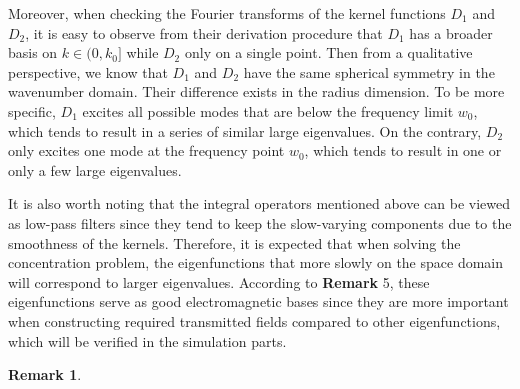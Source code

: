 \documentclass[a4paper,12pt]{article}
\newtheorem{remark}{\bf Remark}
\begin{document}
\begin{framed}
{	\quad Moreover, when checking the Fourier transforms of the kernel functions $D_1$ and $D_2$, it is easy to observe from their derivation procedure that $D_1$ has a broader basis on $k \in (0,k_0]$ while $D_2$ only on a single point. Then from a qualitative perspective, we know that $D_1$ and $D_2$ have the same spherical symmetry in the wavenumber domain. Their difference exists in the radius dimension. To be more specific,
	$D_1$ excites all possible modes that are below the frequency limit $w_0$, which tends to result in a series of similar large eigenvalues. On the contrary, $D_2$ only excites one mode at the frequency point $w_0$, which tends to result in one or only a few large eigenvalues. 
	
	\quad It is also worth noting that the integral operators mentioned above can be viewed as low-pass filters since they tend to keep the slow-varying components due to the smoothness of the kernels. Therefore, it is expected that when solving the concentration problem, the eigenfunctions that more slowly on the space domain will correspond to larger eigenvalues. According to {\bf Remark} 5, these eigenfunctions serve as good electromagnetic bases since they are more important when constructing required transmitted fields compared to other eigenfunctions, which will be verified in the simulation parts.
}

{
	\color{red}
	\setcounter{remark}{5} 
	\begin{remark}
		

\end{remark}}
\end{framed}
\end{document}
